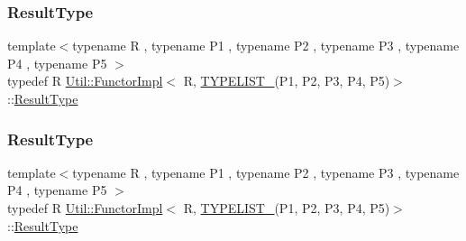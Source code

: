 \mbox{\label{classUtil_1_1FunctorImpl_3_01R_00_01TYPELIST__5_07P1_00_01P2_00_01P3_00_01P4_00_01P5_08_4_ad1b291756f0f94ecde300b4a2ea9ce14}} 
\subsubsection{\texorpdfstring{ResultType}{ResultType}\hspace{0.1cm}{\footnotesize\ttfamily [1/2]}}
{\footnotesize\ttfamily template$<$typename R , typename P1 , typename P2 , typename P3 , typename P4 , typename P5 $>$ \\
typedef R \mbox{\hyperlink{classUtil_1_1FunctorImpl}{Util\+::\+Functor\+Impl}}$<$ R, \mbox{\hyperlink{install_2include_2adat_2typelist_8h_aad5d9b3c82c8503c85c625acd41c0a2f}{T\+Y\+P\+E\+L\+I\+S\+T\+\_}}(P1, P2, P3, P4, P5)$>$\+::\mbox{\hyperlink{structUtil_1_1Private_1_1FunctorImplBase_a5e95fd30fdd89f3c5080b68ab5891bc3}{Result\+Type}}}

\mbox{\label{classUtil_1_1FunctorImpl_3_01R_00_01TYPELIST__5_07P1_00_01P2_00_01P3_00_01P4_00_01P5_08_4_ad1b291756f0f94ecde300b4a2ea9ce14}} 
\subsubsection{\texorpdfstring{ResultType}{ResultType}\hspace{0.1cm}{\footnotesize\ttfamily [2/2]}}
{\footnotesize\ttfamily template$<$typename R , typename P1 , typename P2 , typename P3 , typename P4 , typename P5 $>$ \\
typedef R \mbox{\hyperlink{classUtil_1_1FunctorImpl}{Util\+::\+Functor\+Impl}}$<$ R, \mbox{\hyperlink{install_2include_2adat_2typelist_8h_aad5d9b3c82c8503c85c625acd41c0a2f}{T\+Y\+P\+E\+L\+I\+S\+T\+\_}}(P1, P2, P3, P4, P5)$>$\+::\mbox{\hyperlink{structUtil_1_1Private_1_1FunctorImplBase_a5e95fd30fdd89f3c5080b68ab5891bc3}{Result\+Type}}}



